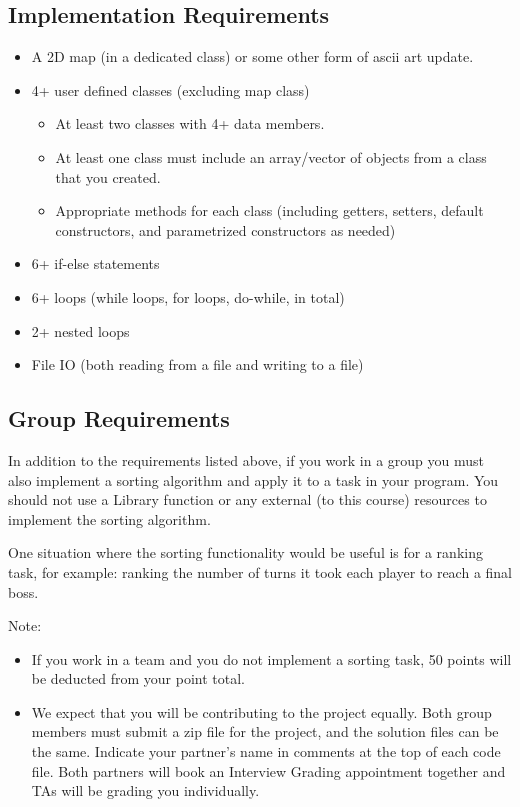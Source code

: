 \subsection{Implementation Requirements}

\begin{itemize}
    \item A 2D map (in a dedicated class) or some other form of ascii art update.
    \item 4+ user defined classes (excluding map class)
    \begin{itemize}
        \item At least two classes with 4+ data members.
        \item At least one class must include an array/vector of objects from a class that you created.
        \item Appropriate methods for each class (including getters, setters, default constructors, and parametrized constructors as needed)
    \end{itemize}
    \item 6+ if-else statements
    \item 6+ loops (while loops, for loops, do-while, in total)
    \item 2+ nested loops
    \item File IO (both reading from a file and writing to a file)
\end{itemize}

\subsection{Group Requirements}
In addition to the requirements listed above, if you work in a group you must also implement a sorting algorithm and apply it to a task in your program. You should not use a Library function or any external (to this course) resources to implement the sorting algorithm.

One situation where the sorting functionality would be useful is for a ranking task, for example: ranking the number of turns it took each player to reach a final boss.

Note:
\begin{itemize}
    \item If you work in a team and you do not implement a sorting task, 50 points will be deducted from your point total.
    \item We expect that you will be contributing to the project equally. Both group members must submit a zip file for the project, and the solution files can be the same. Indicate your partner’s name in comments at the top of each code file. Both partners will book an Interview Grading appointment together and TAs will be grading you individually.
\end{itemize}

